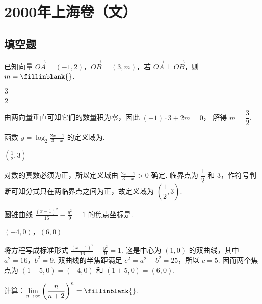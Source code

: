 \chapter{2000年上海卷（文）}
\section{填空题}
\begin{problem}
已知向量 \(\overrightarrow{OA}=(-1,2)\)，\(\overrightarrow{OB}=(3,m)\)，若 \(\overrightarrow{OA}\perp \overrightarrow{OB}\)，则 \(m=\fillinblank{}\).
\end{problem}

\begin{answer}
\(\dfrac{3}{2}\)
\end{answer}

\begin{solution}
由两向量垂直可知它们的数量积为零，因此
\((-1)\cdot3+2m=0\)，
解得 \(m=\dfrac32\).
\end{solution}

\begin{problem}
函数 \(y=\log_2\frac{2x-1}{3-x}\) 的定义域为\fillinblank{}.
\end{problem}

\begin{answer}
\(\left(\frac{1}{2},3\right)\)
\end{answer}

\begin{solution}
对数的真数必须为正，所以定义域由
\(\frac{2x-1}{3-x}>0\)
确定. 临界点为 \(\dfrac12\) 和 \(3\)，作符号判断可知分式只在两临界点之间为正，故定义域为 \(\left(\dfrac12,3\right)\).
\end{solution}

\begin{problem}
圆锥曲线 \(\frac{(x-1)^2}{16}-\frac{y^2}{9}=1\) 的焦点坐标是\fillinblank{}.
\end{problem}

\begin{answer}
\(\left(-4,0\right)\)，\(\left(6,0\right)\)
\end{answer}

\begin{solution}
将方程写成标准形式
\(\frac{(x-1)^2}{16}-\frac{y^2}{9}=1\).
这是中心为 \((1,0)\) 的双曲线，其中 \(a^2=16\)，\(b^2=9\). 双曲线的半焦距满足 \(c^2=a^2+b^2=25\)，所以 \(c=5\). 因而两个焦点为
\((1-5,0)=(-4,0)\) 和 \((1+5,0)=(6,0)\).
\end{solution}

\begin{problem}
计算：\(\displaystyle\lim_{n\to\infty}\left(\frac{n}{n+2}\right)^n=\fillinblank{}\).
\end{problem}


